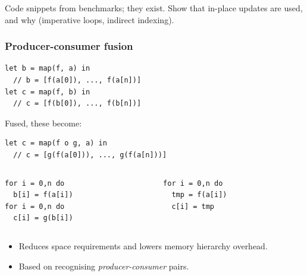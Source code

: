 \documentclass{beamer}
\begin{document}
\begin{frame}
  Code snippets from benchmarks; they exist.  Show that in-place
  updates are used, and why (imperative loops, indirect indexing).
\end{frame}

\begin{frame}[fragile]
  \frametitle{Producer-consumer fusion}

  \begin{lstlisting}
let b = map(f, a) in
  // b = [f(a[0]), ..., f(a[n])]
let c = map(f, b) in
  // c = [f(b[0]), ..., f(b[n])]
\end{lstlisting}

Fused, these become:

\begin{lstlisting}
let c = map(f o g, a) in
  // c = [g(f(a[0])), ..., g(f(a[n]))]
\end{lstlisting}

\begin{columns}
  \begin{column}{0.5\textwidth}
    \begin{lstlisting}
for i = 0,n do
  b[i] = f(a[i])
for i = 0,n do
  c[i] = g(b[i])
\end{lstlisting}
  \end{column}
  \begin{column}{0.5\textwidth}
    \begin{lstlisting}
for i = 0,n do
  tmp = f(a[i])
  c[i] = tmp
\end{lstlisting}
  \end{column}
\end{columns}

\begin{itemize}
\item Reduces space requirements and lowers memory hierarchy overhead.
\item Based on recognising \textit{producer-consumer} pairs.
\end{itemize}
\end{frame}
\end{document}
